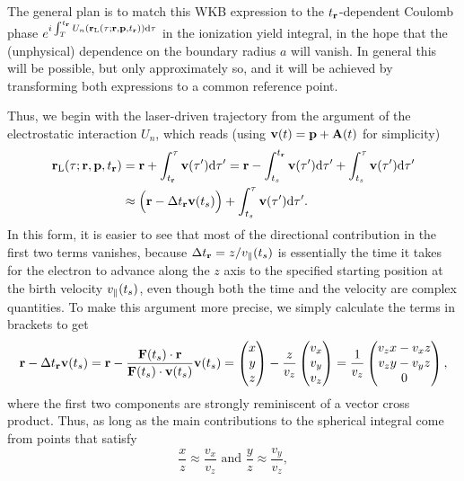 The general plan is to match this WKB expression to the ${t_{\vb{r}}}$-dependent Coulomb phase $e^{i\int_T^{{t_{\vb{r}}}} U_n(\vb{r}_\mathrm{L}(\tau;\vb{r},\vb{p},{t_{\vb{r}}}))\mathrm{d}\tau}$ in the ionization yield integral, in the hope that the (unphysical) dependence on the boundary radius $a$ will vanish. In general this will be possible, but only approximately so, and it will be achieved by transforming both expressions to a common reference point.

Thus, we begin with the laser-driven trajectory from the argument of the electrostatic interaction $U_n$, which reads (using $\vb{v}(t)=\vb{p}+\vb{A}(t)$ for simplicity)
\begin{align}
\vb{r}_\mathrm{L}(\tau;\vb{r},\vb{p},{t_{\vb{r}}})
& =
\vb{r}+\int_{t_{\vb{r}}}^\tau \vb{v}(\tau')\mathrm{d}\tau'
=
\vb{r}-\int^{t_{\vb{r}}}_{{t_s}} \vb{v}(\tau')\mathrm{d}\tau'+\int_{{t_s}}^\tau \vb{v}(\tau')\mathrm{d}\tau'
\nonumber \\ & \approx
\Big( \vb{r} - \Delta{t_{\ensuremath{\vb{r}}}}\vb{v}({t_s}) \Big) + \int_{{t_s}}^\tau \vb{v}(\tau')\mathrm{d}\tau'.
\end{align}
In this form, it is easier to see that most of the directional contribution in the first two terms vanishes, because $\Delta{t_{\ensuremath{\vb{r}}}} = z/{v_{\parallel}}({t_s})$ is essentially the time it takes for the electron to advance along the $z$ axis to the specified starting position at the birth velocity ${v_{\parallel}}({t_s})$, even though both the time and the velocity are complex quantities. To make this argument more precise, we simply calculate the terms in brackets to get
\begin{align}
\vb{r} - \Delta{t_{\ensuremath{\vb{r}}}} \vb{v}({t_s})
= 
\vb{r} - \frac{\vb{F}({t_s})\cdot\vb{r}}{\vb{F}({t_s})\cdot\vb{v}({t_s})} \vb{v}({t_s}) 
=
\begin{pmatrix}x\\y\\z\end{pmatrix} - \frac{z}{v_z}\begin{pmatrix}v_x\\v_y\\v_z \end{pmatrix}=\frac{1}{v_z}\begin{pmatrix}v_z x-v_x z\\v_z y-v_y z\\0\end{pmatrix},
\end{align}
where the first two components are strongly reminiscent of a vector cross product. Thus, as long as the main contributions to the spherical integral come from points that satisfy
\begin{equation}
\frac{x}{z}\approx \frac{v_x}{v_z}\textrm{ and }\frac{y}{z}\approx \frac{v_y}{v_z},
\end{equation}
